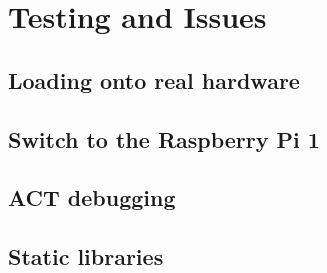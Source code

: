 \section{Testing and Issues}
\subsection{Loading onto real hardware}
\subsection{Switch to the Raspberry Pi 1}
\subsection{ACT debugging}
\subsection{Static libraries}
